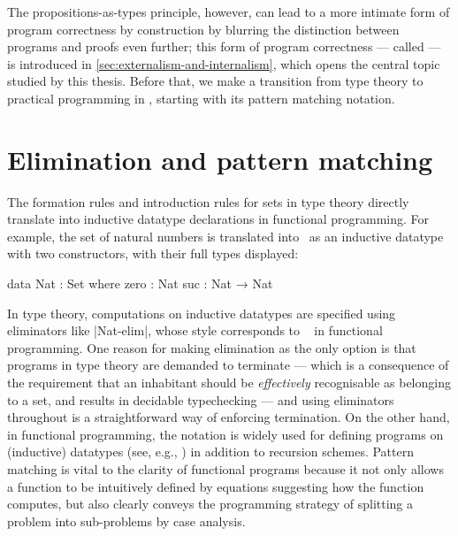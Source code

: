 The propositions-as-types principle, however, can lead to a more intimate form of program correctness by construction by blurring the distinction between programs and proofs even further; this form of program correctness --- called  --- is introduced in \autoref{sec:externalism-and-internalism}, which opens the central topic studied by this thesis.
Before that, we make a transition from type theory to practical programming in \Agda, starting with its pattern matching notation.

\section{Elimination and pattern matching}
\label{sec:pattern-matching}

The formation rules and introduction rules for sets in type theory directly translate into inductive datatype declarations in functional programming.
For example, the set of natural numbers is translated into \Agda\ as an inductive datatype with two constructors, with their full types displayed:
\begin{code}
data Nat : Set where
  zero  : Nat
  suc   : Nat → Nat
\end{code}
In type theory, computations on inductive datatypes are specified using eliminators like |Nat-elim|, whose style corresponds to ~\citep{Meijer-bananas} in functional programming.
One reason for making elimination as the only option is that programs in type theory are demanded to terminate --- which is a consequence of the requirement that an inhabitant should be \emph{effectively} recognisable as belonging to a set, and results in decidable typechecking --- and using eliminators throughout is a straightforward way of enforcing termination.
On the other hand, in functional programming, the  notation is widely used for defining programs on (inductive) datatypes (see, e.g., \citet[Section~5]{Hudak-history-of-Haskell}) in addition to recursion schemes.
Pattern matching is vital to the clarity of functional programs because it not only allows a function to be intuitively defined by equations suggesting how the function computes, but also clearly conveys the programming strategy of splitting a problem into sub-problems by case analysis.

